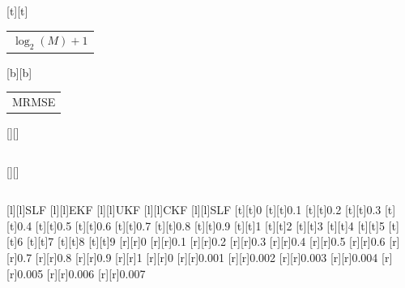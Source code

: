 %    
%
%
\begin{psfrags}%
\psfragscanon%
%
[t][t]{\color[rgb]{0,0,0}\setlength{\tabcolsep}{0pt}\begin{tabular}{c}$\log_2 (M) + 1$\end{tabular}}%
[b][b]{\color[rgb]{0,0,0}\setlength{\tabcolsep}{0pt}\begin{tabular}{c}MRMSE\end{tabular}}%
[][]{\color[rgb]{0,0,0}\setlength{\tabcolsep}{0pt}\begin{tabular}{c} \end{tabular}}%
[][]{\color[rgb]{0,0,0}\setlength{\tabcolsep}{0pt}\begin{tabular}{c} \end{tabular}}%
[l][l]{\color[rgb]{0,0,0}SLF}%
[l][l]{\color[rgb]{0,0,0}EKF}%
[l][l]{\color[rgb]{0,0,0}UKF}%
[l][l]{\color[rgb]{0,0,0}CKF}%
[l][l]{\color[rgb]{0,0,0}SLF}%
%
[t][t]{0}%
[t][t]{0.1}%
[t][t]{0.2}%
[t][t]{0.3}%
[t][t]{0.4}%
[t][t]{0.5}%
[t][t]{0.6}%
[t][t]{0.7}%
[t][t]{0.8}%
[t][t]{0.9}%
[t][t]{1}%
[t][t]{2}%
[t][t]{3}%
[t][t]{4}%
[t][t]{5}%
[t][t]{6}%
[t][t]{7}%
[t][t]{8}%
[t][t]{9}%
%
[r][r]{0}%
[r][r]{0.1}%
[r][r]{0.2}%
[r][r]{0.3}%
[r][r]{0.4}%
[r][r]{0.5}%
[r][r]{0.6}%
[r][r]{0.7}%
[r][r]{0.8}%
[r][r]{0.9}%
[r][r]{1}%
[r][r]{0}%
[r][r]{0.001}%
[r][r]{0.002}%
[r][r]{0.003}%
[r][r]{0.004}%
[r][r]{0.005}%
[r][r]{0.006}%
[r][r]{0.007}%

\end{psfrags}
